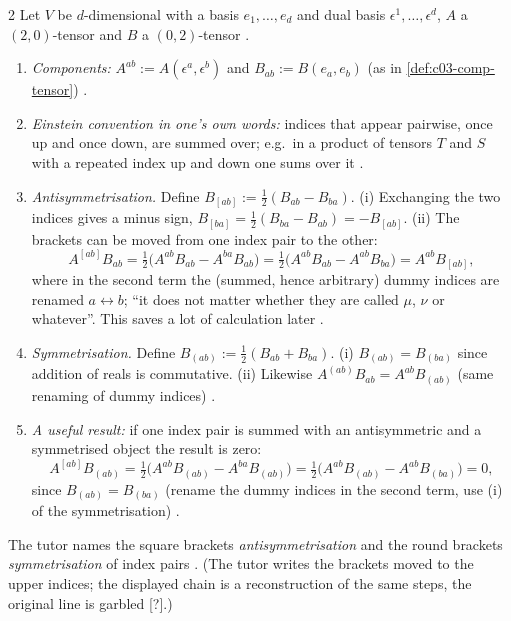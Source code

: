 \begin{paracol}{2}
Let $V$ be $d$-dimensional with a basis $e_1,\dots,e_d$ and dual basis $\epsilon^1,\dots,\epsilon^d$, $A$ a $(2,0)$-tensor and $B$ a $(0,2)$-tensor .
\begin{enumerate}
  \item \emph{Components:} $A^{ab}:=A(\epsilon^a,\epsilon^b)$ and $B_{ab}:=B(e_a,e_b)$ (as in \cref{def:c03-comp-tensor}) .
  \item \emph{Einstein convention in one's own words:} indices that appear pairwise, once up and once down, are summed over; e.g.\ in a product of tensors $T$ and $S$ with a repeated index up and down one sums over it .
  \item \emph{Antisymmetrisation.} Define $B_{[ab]}:=\tfrac12(B_{ab}-B_{ba})$. (i) Exchanging the two indices gives a minus sign, $B_{[ba]}=\tfrac12(B_{ba}-B_{ab})=-B_{[ab]}$. (ii) The brackets can be moved from one index pair to the other:
        \[
          A^{[ab]}B_{ab}=\tfrac12\bigl(A^{ab}B_{ab}-A^{ba}B_{ab}\bigr)=\tfrac12\bigl(A^{ab}B_{ab}-A^{ab}B_{ba}\bigr)=A^{ab}B_{[ab]},
        \]
        where in the second term the (summed, hence arbitrary) dummy indices are renamed $a\leftrightarrow b$; ``it does not matter whether they are called $\mu$, $\nu$ or whatever''. This saves a lot of calculation later .
  \item \emph{Symmetrisation.} Define $B_{(ab)}:=\tfrac12(B_{ab}+B_{ba})$. (i) $B_{(ab)}=B_{(ba)}$ since addition of reals is commutative. (ii) Likewise $A^{(ab)}B_{ab}=A^{ab}B_{(ab)}$ (same renaming of dummy indices) .
  \item \emph{A useful result:} if one index pair is summed with an antisymmetric and a symmetrised object the result is zero:
        \[
          A^{[ab]}B_{(ab)}=\tfrac12\bigl(A^{ab}B_{(ab)}-A^{ba}B_{(ab)}\bigr)=\tfrac12\bigl(A^{ab}B_{(ab)}-A^{ab}B_{(ba)}\bigr)=0,
        \]
        since $B_{(ab)}=B_{(ba)}$ (rename the dummy indices in the second term, use (i) of the symmetrisation) .
\end{enumerate}
The tutor names the square brackets \emph{antisymmetrisation} and the round brackets \emph{symmetrisation} of index pairs . (The tutor writes the brackets moved to the upper indices; the displayed chain is a reconstruction of the same steps, the original line is garbled [?].)


\end{paracol}

